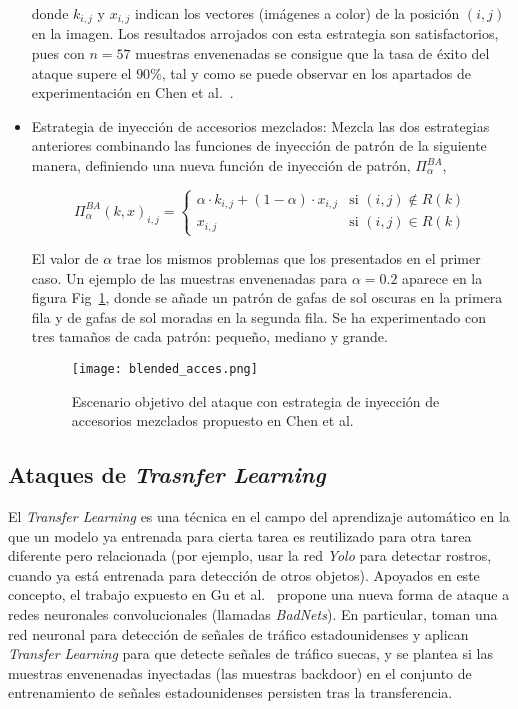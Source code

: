 \begin{itemize}
    donde $k_{i,j}$ y $x_{i,j}$ indican los vectores (imágenes a color) de la posición $(i,j)$ en la imagen.
    Los resultados arrojados con esta estrategia son satisfactorios, pues con $n=57$ muestras envenenadas se consigue que la tasa de éxito del ataque supere el $90\%$, tal y como se puede observar en los apartados de experimentación en Chen et al.~\cite{Backdoor}.
    
    \item Estrategia de inyección de accesorios mezclados: Mezcla las dos estrategias anteriores combinando las funciones de inyección de patrón de la siguiente manera, definiendo una nueva función de inyección de patrón, $\Pi_{\alpha}^{BA}$,
	
	\[
\Pi_{\alpha}^{BA}(k,x)_{i,j} = 
\begin{cases}
    \alpha \cdot k_{i,j} + (1-\alpha) \cdot x_{i,j} & \text{si } (i,j) \notin R(k) \\
    x_{i,j} & \text{si } (i,j) \in R(k)
\end{cases}
	\]
	
	El valor de $\alpha$ trae los mismos problemas que los presentados en el primer caso. Un ejemplo de las muestras envenenadas para $\alpha=0.2$ aparece en la figura Fig~\ref{fig:backdoor3}, donde se añade un patrón de gafas de sol oscuras en la primera fila y de gafas de sol moradas en la segunda fila. Se ha  experimentado con tres tamaños de cada patrón: pequeño, mediano y grande.
	
	\begin{figure}[h]
    \centering
    \texttt{[image: blended\_acces.png]}
    \caption{Escenario objetivo del ataque  con estrategia de inyección de accesorios mezclados propuesto en Chen et al.~\cite{Backdoor}}
    \label{fig:backdoor3}
\end{figure}
	
\end{itemize}

\subsection*{Ataques de \textit{Trasnfer Learning}}

El \textit{Transfer Learning} es una técnica en el campo del aprendizaje automático en la que un modelo ya entrenada para cierta tarea es reutilizado para otra tarea diferente pero relacionada (por ejemplo, usar la red \textit{Yolo} para detectar rostros, cuando ya está entrenada para detección de otros objetos). Apoyados en este concepto, el trabajo expuesto en Gu et al.~\cite{BadNets} propone una nueva forma de ataque a redes neuronales convolucionales (llamadas \textit{BadNets}). En particular, toman una red neuronal para detección de señales de tráfico estadounidenses y aplican \textit{Transfer Learning} para que detecte señales de tráfico suecas, y se plantea si las muestras envenenadas inyectadas (las muestras backdoor) en el conjunto de entrenamiento de señales estadounidenses persisten tras la transferencia.

